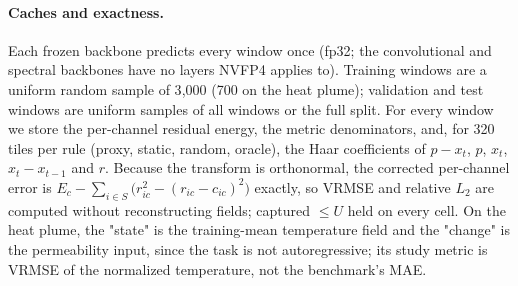 \documentclass{article}
\begin{document}
\label{app:alloc}

\paragraph{Caches and exactness.} Each frozen backbone predicts every window once (fp32; the convolutional and spectral
backbones have no layers NVFP4 applies to). Training windows are a uniform random sample of 3{,}000 (700 on the heat
plume); validation and test windows are uniform samples of all windows or the full split. For every window we store
the per-channel residual energy, the metric denominators, and, for 320 tiles per rule (proxy, static, random, oracle),
the Haar coefficients of $p - x_t$, $p$, $x_t$, $x_t - x_{t-1}$ and $r$. Because the transform is orthonormal, the
corrected per-channel error is $E_c - \sum_{i\in S}\big(r_{ic}^2 - (r_{ic} - c_{ic})^2\big)$ exactly, so VRMSE and
relative $L_2$ are computed without reconstructing fields; captured $\le U$ held on every cell. On the heat plume, the
"state" is the training-mean temperature field and the "change" is the permeability input, since the task is not
autoregressive; its study metric is VRMSE of the normalized temperature, not the benchmark's MAE.
\end{document}
